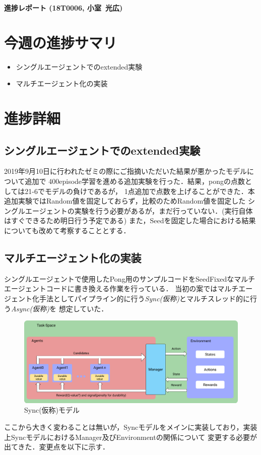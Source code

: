 \documentclass[11pt,a4paper]{jsarticle}
\def\stdid{18T0006}		%
\def\sirname{小室}		%
\def\firstname{光広}		%
\begin{document}

\noindent
\textbf{\large 進捗レポート (\stdid, \sirname\ \firstname)}		%

\section*{今週の進捗サマリ}			%

\begin{itemize}
  \item シングルエージェントでのextended実験
  \item マルチエージェント化の実装
\end{itemize}

\section{進捗詳細}					%
\subsection{シングルエージェントでのextended実験}
2019年9月10日に行われたゼミの際にご指摘いただいた結果が悪かったモデルについて追加で
400episode学習を進める追加実験を行った．結果，pongの点数としては21-6でモデルの負けであるが，
1点追加で点数を上げることができた．本追加実験ではRandom値を固定しておらず，比較のためRandom値を固定した
シングルエージェントの実験を行う必要があるが，まだ行っていない．(実行自体はすぐできるため明日行う予定である)
また，Seedを固定した場合における結果についても改めて考察することとする．

\subsection{マルチエージェント化の実装}
シングルエージェントで使用したPong用のサンプルコードをSeedFixedなマルチエージェントコードに書き換える作業を行っている．
当初の案ではマルチエージェント化手法としてパイプライン的に行う\textit{Sync(仮称)}とマルチスレッド的に行う\textit{Async(仮称)}を
想定していた．
\begin{figure}[htbp]
  \begin{center}
    \includegraphics[width=14cm]{fig1.png}
    \caption{Sync(仮称)モデル}
  \end{center}
  \label{fig1}
\end{figure}
ここから大きく変わることは無いが，Syncモデルをメインに実装しており，実装上SyncモデルにおけるManager及びEnvironmentの関係について
変更する必要が出てきた．変更点を以下に示す．
\end{document}
